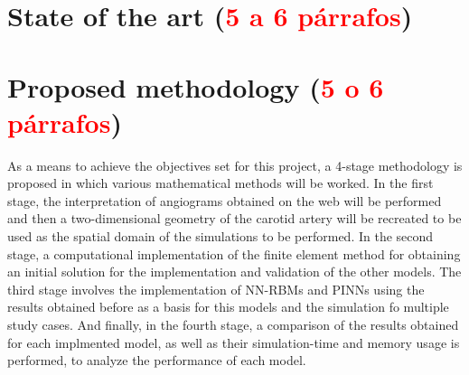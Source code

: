\documentclass[12pt,letterpaper]{article}
\begin{document}
\section{State of the art (\textcolor{red}{5 a 6 párrafos})}

\section{Proposed methodology (\textcolor{red}{5 o 6 párrafos})}

As a means to achieve the objectives set for this project, a 4-stage methodology is proposed in which
various mathematical methods will be worked. In the first stage, the interpretation of angiograms
obtained on the web will be performed and then a two-dimensional geometry of the carotid artery will
be recreated to be used as the spatial domain of the simulations to be performed. In the second stage, 
a computational implementation of the finite element method for obtaining an initial solution for the 
implementation and validation of the other models. The third stage involves the implementation of NN-RBMs and 
PINNs using the results obtained before as a basis for this models and the simulation fo multiple study 
cases. And finally, in the fourth stage, a comparison of the results obtained for each implmented model, as well as their simulation-time and memory usage is performed, to analyze the performance of each model.\\
\end{document}
